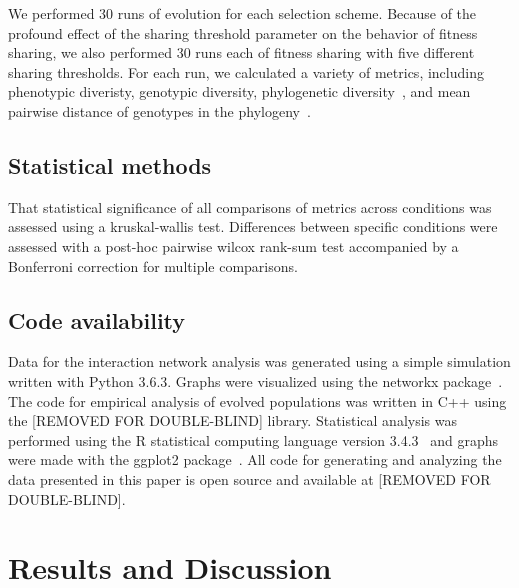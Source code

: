 We performed 30 runs of evolution for each selection scheme. Because of the profound effect of the sharing threshold parameter on the behavior of fitness sharing, we also performed 30 runs each of fitness sharing with five different sharing thresholds. For each run, we calculated a variety of metrics, including phenotypic diveristy, genotypic diversity, phylogenetic diversity~\cite{faith_conservation_1992}, and mean pairwise distance of genotypes in the phylogeny~\cite{webb_exploring_2000}. 

\subsection{Statistical methods}
That statistical significance of all comparisons of metrics across conditions was assessed using a kruskal-wallis test. Differences between specific conditions were assessed with a post-hoc pairwise wilcox rank-sum test accompanied by a Bonferroni correction for multiple comparisons.

\subsection{Code availability}
Data for the interaction network analysis was generated using a simple simulation written with Python 3.6.3. Graphs were visualized using the networkx package~\cite{hagberg_exploring_2008}. The code for empirical analysis of evolved populations was written in C++ using the [REMOVED FOR DOUBLE-BLIND] library. Statistical analysis was performed using the R statistical computing language version 3.4.3~\cite{r_core_team_r:_2017} and graphs were made with the ggplot2 package~\cite{wickham_ggplot2:_2009}. All code for generating and analyzing the data presented in this paper is open source and available at [REMOVED FOR DOUBLE-BLIND]. 

\section{Results and Discussion}

